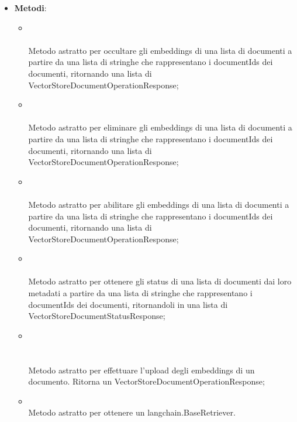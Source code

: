 \documentclass[10pt, a4paper]{article}
\begin{document}
\label{VectorStoreManagerDettaglio}
\begin{itemize}
    \item \textbf{Metodi}:
    \begin{itemize}
        \item {}\\ \\
        Metodo astratto per occultare gli embeddings di una lista di documenti a partire da una lista di stringhe che rappresentano i documentIds dei documenti, ritornando una lista di VectorStoreDocumentOperationResponse;

        \item {}\\ \\
        Metodo astratto per eliminare gli embeddings di una lista di documenti a partire da una lista di stringhe che rappresentano i documentIds dei documenti, ritornando una lista di VectorStoreDocumentOperationResponse;

        \item {}\\ \\
        Metodo astratto per abilitare gli embeddings di una lista di documenti a partire da una lista di stringhe che rappresentano i documentIds dei documenti, ritornando una lista di VectorStoreDocumentOperationResponse;

        \item {}\\ \\
        Metodo astratto per ottenere gli status di una lista di documenti dai loro metadati a partire da una lista di stringhe che rappresentano i documentIds dei documenti, ritornandoli in una lista di VectorStoreDocumentStatusResponse;

        \item {}\\ 
        \\ 
        \\ 
        Metodo astratto per effettuare l'upload degli embeddings di un documento. Ritorna un VectorStoreDocumentOperationResponse;
      
        \item {}\\
        Metodo astratto per ottenere un langchain.BaseRetriever.
    \end{itemize}
\end{itemize}
\end{document}
